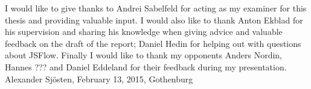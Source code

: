 \thispagestyle{empty}

\begin{acknowledgements}
I would like to give thanks to Andrei Sabelfeld for acting as my examiner for this thesis and providing valuable input. I would also like to thank Anton Ekblad for his supervision and sharing his knowledge when giving advice and valuable feedback on the draft of the report; Daniel Hedin for helping out with questions about JSFlow. Finally I would like to thank my opponents Anders Nordin, Hannes ??? and Daniel Eddeland for their feedback during my presentation. \\[1cm]

\hfill Alexander Sjösten, February 13, 2015, Gothenburg
\end{acknowledgements}
